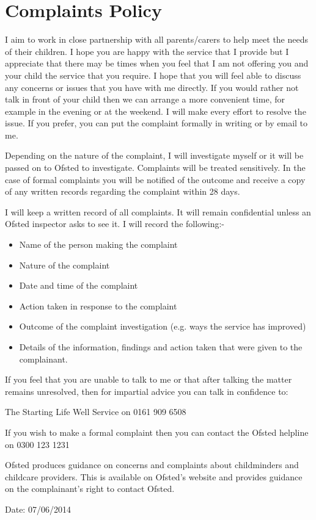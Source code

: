 

\section{Complaints Policy}

I aim to work in close partnership with all parents/carers to help meet
the needs of their children. I hope you are happy with the service that
I provide but I appreciate that there may be times when you feel that I
am not offering you and your child the service that you require. I hope
that you will feel able to discuss any concerns or issues that you have
with me directly. If you would rather not talk in front of your child
then we can arrange a more convenient time, for example in the evening
or at the weekend. I will make every effort to resolve the issue. If you
prefer, you can put the complaint formally in writing or by email to me.

Depending on the nature of the complaint, I will investigate myself or
it will be passed on to Ofsted to investigate. Complaints will be
treated sensitively. In the case of formal complaints you will be
notified of the outcome and receive a copy of any written records
regarding the complaint within 28 days.

I will keep a written record of all complaints. It will remain
confidential unless an Ofsted inspector asks to see it. I will record
the following:-

\begin{itemize}
\item
  Name of the person making the complaint~
\item
  Nature of the complaint~
\item
  Date and time of the complaint~
\item
  Action taken in response to the complaint~
\item
  Outcome of the complaint investigation (e.g. ways the service has
  improved)~
\item
  Details of the information, findings and action taken that were given
  to the complainant. ~
\end{itemize}

If you feel that you are unable to talk to me or that after talking the
matter remains unresolved, then for impartial advice you can talk in
confidence to:

The Starting Life Well Service on 0161 909 6508

If you wish to make a formal complaint then you can contact the Ofsted
helpline on 0300 123 1231

Ofsted produces guidance on concerns and complaints about childminders
and childcare providers. This is available on Ofsted's website and
provides guidance on the complainant's right to contact Ofsted.

Date: 07/06/2014


